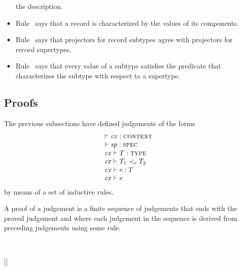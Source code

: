 \begin{itemize}
the description.
\item
Rule \Rthrec\ says that a record is characterized by the values of its
components.
\item
Rule \Rthprojsub\ says that projectors for record subtypes agree with
projectors for record supertypes.
\item
Rule \Rthsub\ says that every value of a subtype satisfies the predicate that
characterizes the subtype with respect to a supertype.
\end{itemize}

\subsection{Proofs}

The previous subsections have defined judgements of the forms
\[
\begin{array}{l}
\vdash\mathit{cx}:\textsc{context} \\
\vdash\mathit{sp}:\textsc{spec} \\
\mathit{cx}\vdash T:\textsc{type} \\
\mathit{cx}\vdash T_1\prec_{r}T_2 \\
\mathit{cx}\vdash e:T \\
\mathit{cx}\vdash e
\end{array}
\]
by means of a set of inductive rules.

A proof of a judgement is a finite sequence of judgements that ends with the
proved judgement and where each judgement in the sequence is derived from
preceding judgements using some rule.

\

\noindent
[[[TO DO: Make sure that the rules for theorems are ``sufficient'', i.e.\ all
truths ``of interest'' are indeed theorems derivable from the rules. Even
though higher-order logic is notoriously incomplete, in practice theorem
provers like PVS and HOL are sufficient to prove desired properties of
formalized concepts without running into theoretical limitations. Perhaps the
requirement boils down to prove completeness with respect to so-called
``general models'' (cf.\ \cite{andrews}).]]]
